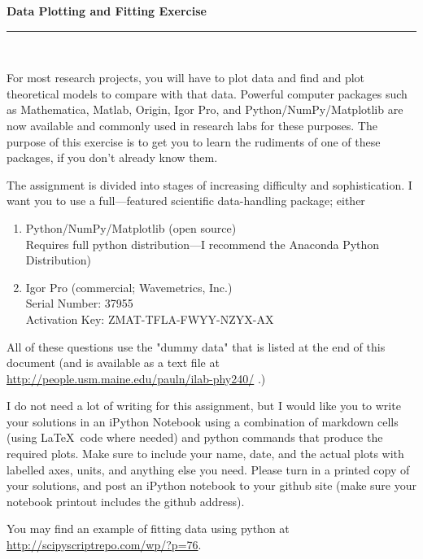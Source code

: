 \documentclass[aps,secnumarabic,balancelastpage,amsmath,amssymb,nofootinbib]{revtex4-1}
\begin{document}
\thispagestyle{empty}
\begin{center}
{\large \bf Data Plotting and Fitting Exercise}
\rule{\columnwidth}{0.5pt}\\[-15mm]
\end{center}
\vspace*{-2mm}
For most research projects, you will have to plot data and 
find and plot theoretical models to compare with that data. 
Powerful computer packages such as Mathematica, Matlab,
Origin, Igor Pro, and Python/NumPy/Matplotlib are now available and 
commonly used in research labs for these purposes. 
The purpose of this exercise is to get you to learn the rudiments 
of one of these packages, if you don't already know them.

The assignment is divided into stages of increasing difficulty and sophistication. 
I want you to use a full---featured scientific data-handling package; either\\[-8mm]
\begin{enumerate}
\item Python/NumPy/Matplotlib (open source)\\ Requires full python distribution---I recommend the Anaconda Python Distribution)
\item Igor Pro (commercial; Wavemetrics, Inc.)\\ Serial Number: 37955\\Activation Key: ZMAT-TFLA-FWYY-NZYX-AX
\end{enumerate} 
\vspace*{-5mm}
All of these questions use the "dummy data" that is listed at the end of this document (and is 
available as a text file at \href{http://people.usm.maine.edu/pauln/ilab-phy240/}{http://people.usm.maine.edu/pauln/ilab-phy240/} .)

I do not need a lot of writing for this assignment, but I would like you to write your solutions in an iPython Notebook using a combination of markdown cells (using  \LaTeX\ code where needed) and python commands that produce the required plots.  
Make sure to include your name, date, and the actual plots with labelled axes, units, and anything else you
need. Please turn in a printed copy of your solutions, and post an iPython notebook to your github site (make sure your notebook printout
includes the github address). 

You may find an example of fitting data using python at \href{http://scipyscriptrepo.com/wp/?p=76}{http://scipyscriptrepo.com/wp/?p=76}.
\end{document}
